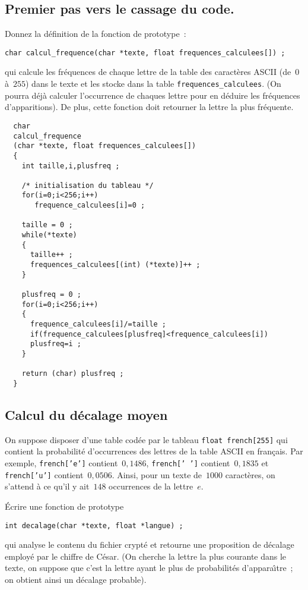 \subsection{Premier pas vers le cassage du code.}
Donnez la d\'efinition de la fonction de prototype~:
\begin{verbatim}
char calcul_frequence(char *texte, float frequences_calculees[]) ;
\end{verbatim}
qui calcule les fr\'equences de chaque lettre de la table des
caract\`eres ASCII (de~$0$ \`a~$255$) dans le texte et les stocke dans
la table \verb+frequences_calculees+. (On pourra d\'ej\`a calculer
l'occurrence de chaques lettre pour en d\'eduire les fr\'equences
d'apparitions).  De plus, cette fonction doit retourner la lettre la
plus fr\'equente.
\ifcorrection
\begin{correction}
\begin{verbatim}
  char 
  calcul_frequence
  (char *texte, float frequences_calculees[]) 
  {
    int taille,i,plusfreq ;

    /* initialisation du tableau */
    for(i=0;i<256;i++)
       frequence_calculees[i]=0 ;

    taille = 0 ;
    while(*texte)
    {
      taille++ ;
      frequences_calculees[(int) (*texte)]++ ;
    }

    plusfreq = 0 ;
    for(i=0;i<256;i++)
    {
      frequence_calculees[i]/=taille ;
      if(frequence_calculees[plusfreq]<frequence_calculees[i])
      plusfreq=i ;
    }
      
    return (char) plusfreq ;
  }
\end{verbatim}
\end{correction}
\fi
\subsection{Calcul du d\'ecalage moyen}
On suppose disposer d'une table cod\'ee par le tableau \texttt{float
  french[255]} qui contient la probabilit\'e d'occurrences des lettres
de la table ASCII en fran\c{c}ais. Par exemple, \texttt{french['e']}
contient~$0,1486$, \texttt{french[' ']} contient~$0,1835$ et
\texttt{french['u']} contient~$0,0506$.  Ainsi, pour un texte
de~$1000$ caract\`eres, on s'attend \`a ce qu'il y ait~$148$
occurrences de la lettre~$e$.
\par\bigskip
\'Ecrire une fonction de prototype
\begin{verbatim}
int decalage(char *texte, float *langue) ;
\end{verbatim}
qui analyse le contenu du fichier crypt\'e et retourne une proposition
de d\'ecalage employ\'e par le chiffre de C\'esar. (On cherche la
lettre la plus courante dans le texte, on suppose que c'est la lettre
ayant le plus de probabilit\'es d'appara\^\i{}tre~; on obtient ainsi
un d\'ecalage probable).

